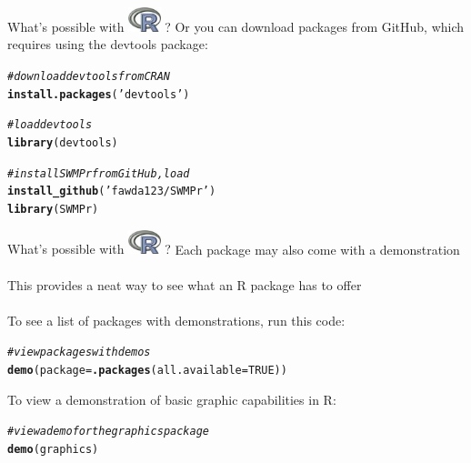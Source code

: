 \documentclass[xcolor=svgnames]{beamer}\usepackage[]{graphicx}\usepackage[]{color}
\makeatletter
\newcommand{\hlnum}[1]{\textcolor[rgb]{0.686,0.059,0.569}{#1}}%
\newcommand{\hlstr}[1]{\textcolor[rgb]{0.192,0.494,0.8}{#1}}%
\newcommand{\hlcom}[1]{\textcolor[rgb]{0.678,0.584,0.686}{\textit{#1}}}%
\newcommand{\hlstd}[1]{\textcolor[rgb]{0.345,0.345,0.345}{#1}}%
\newcommand{\hlkwc}[1]{\textcolor[rgb]{0.333,0.667,0.333}{#1}}%
\newcommand{\hlkwd}[1]{\textcolor[rgb]{0.737,0.353,0.396}{\textbf{#1}}}%
\newenvironment{kframe}{%
 \def\at@end@of@kframe{}%
 \ifinner\ifhmode%
  \def\at@end@of@kframe{\end{minipage}}%
  \begin{minipage}{\columnwidth}%
 \fi\fi%
 \def\FrameCommand##1{\hskip\@totalleftmargin \hskip-\fboxsep
 \colorbox{shadecolor}{##1}\hskip-\fboxsep
     \hskip-\linewidth \hskip-\@totalleftmargin \hskip\columnwidth}%
 \MakeFramed {\advance\hsize-\width
   \@totalleftmargin\z@ \linewidth\hsize
   \@setminipage}}%
 {\par\unskip\endMakeFramed%
 \at@end@of@kframe}
\newenvironment{knitrout}{}{} %
\makeatother
\begin{document}
\begin{frame}[t,fragile]{What's possible with \includegraphics[width=0.07\textwidth]{Rlogo.jpg} \hspace{0.2em}? }
Or you can download packages from GitHub, which requires using the devtools package:
\begin{knitrout}\scriptsize
{}\color{fgcolor}\begin{kframe}
\begin{alltt}
\hlcom{# download devtools from CRAN}
\hlkwd{install.packages}\hlstd{(}\hlstr{'devtools'}\hlstd{)}

\hlcom{# load devtools}
\hlkwd{library}\hlstd{(devtools)}

\hlcom{# install SWMPr from GitHub, load}
\hlkwd{install_github}\hlstd{(}\hlstr{'fawda123/SWMPr'}\hlstd{)}
\hlkwd{library}\hlstd{(SWMPr)}
\end{alltt}
\end{kframe}
\end{knitrout}
\end{frame}

\begin{frame}[t,fragile]{What's possible with \includegraphics[width=0.07\textwidth]{Rlogo.jpg} \hspace{0.2em}? }
Each package may also come with a demonstration\\~\\
This provides a neat way to see what an R package has to offer\\~\\
To see a list of packages with demonstrations, run this code:
\begin{knitrout}\scriptsize
{}\color{fgcolor}\begin{kframe}
\begin{alltt}
\hlcom{# view packages with demos}
\hlkwd{demo}\hlstd{(}\hlkwc{package} \hlstd{=} \hlkwd{.packages}\hlstd{(}\hlkwc{all.available} \hlstd{=} \hlnum{TRUE}\hlstd{))}
\end{alltt}
\end{kframe}
\end{knitrout}
To view a demonstration of basic graphic capabilities in R:
\begin{knitrout}\scriptsize
{}\color{fgcolor}\begin{kframe}
\begin{alltt}
\hlcom{# view a demo for the graphics package}
\hlkwd{demo}\hlstd{(graphics)}
\end{alltt}
\end{kframe}
\end{knitrout}
\end{frame}
\end{document}
